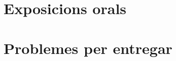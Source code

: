 \documentclass[11pt,fleqn]{book} %
\newcounter{let} \setcounter{let}{0}
\renewcommand{\1}{\mathbf{1}}
\newcommand{\0}{\mathbf{0}}
\begin{document}
\chapter{Exposicions orals}
{
\let\paragraph\subsubsection
\let\subsubsection\subsection
\let\subsection\section


}

\chapter{Problemes per entregar}
{
\let\paragraph\subsubsection
\let\subsubsection\subsection
\let\subsection\section


}
\end{document}
